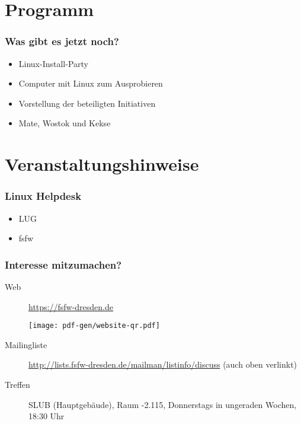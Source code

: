 \documentclass[t]{beamer}
\begin{document}
\section{Programm}
\begin{frame}
  \frametitle{Was gibt es jetzt noch?}
  \begin{itemize}
  \item Linux-Install-Party
  \item Computer mit Linux zum Ausprobieren
  \item Vorstellung der beteiligten Initiativen
  \item Mate, Wostok und Kekse
  \end{itemize}
\end{frame}

\section{Veranstaltungshinweise}
\begin{frame}
  \frametitle{Linux Helpdesk}
  \begin{itemize}
  \item LUG
  \item fsfw
  \end{itemize}
\end{frame}

\begin{frame}
  \frametitle{Interesse mitzumachen?}
  \begin{description}
  \item[Web] \url{https://fsfw-dresden.de}\\
    \begin{center}
      \hspace*{-6em}
      \texttt{[image: pdf-gen/website-qr.pdf]}
    \end{center}
  \item[Mailingliste] \url{http://lists.fsfw-dresden.de/mailman/listinfo/discuss} (auch oben verlinkt)
  \item[Treffen] SLUB (Hauptgebäude), Raum -2.115, Donnerstags in ungeraden Wochen, 18:30 Uhr
  \end{description}
\end{frame}
\end{document}
